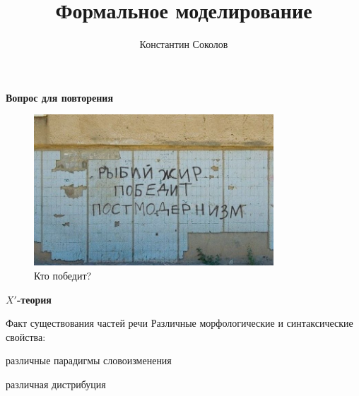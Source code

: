 \documentclass{beamer}
\begin{document}
\title{\large{\sc Формальное моделирование}}
\author{Константин Соколов}

\begin{frame}
    \thispagestyle{empty}
    \titlepage
\end{frame}


\begin{frame}{}
\begin{center}
	\textbf{Вопрос для повторения}
\end{center}
\end{frame}

\begin{frame}{}
\begin{figure}[H]
	\includegraphics[width=0.8\textwidth]{oil.jpg}
	\caption*{Кто победит?}
\end{figure}
\end{frame}

\begin{frame}{}
\begin{center}
	\textbf{$X'$-теория}
\end{center}
\end{frame}

\begin{frame}{Факт существования частей речи}
Различные морфологические и синтаксические свойства:\\
\medskip
\begin{exe}
	\ex различные парадигмы словоизменения
	    \begin{xlist}
        \end{xlist}
    \ex различная дистрибуция
	    \begin{xlist}
        \end{xlist}
\end{exe}
\end{frame}
\end{document}
